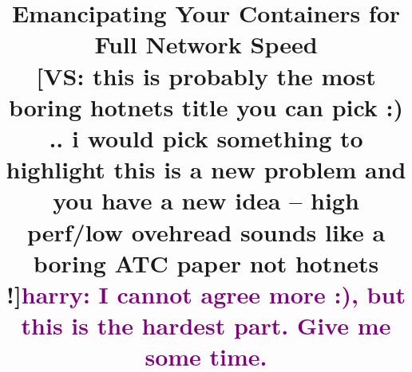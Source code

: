 \documentclass{cls/hotnets16}
\def\harry#1{{\textcolor{purple}{harry: {\sf #1}}}}
\newcommand{\vyas}[1]{{\footnotesize\color{red}[VS: #1]}}
\begin{document}
\title{Emancipating Your Containers for Full Network Speed
 \\ \vyas{this is probably the most boring hotnets title you can pick :) .. i would pick 
 something to highlight this is a new problem and you have a new idea -- high perf/low ovehread sounds like a boring ATC paper not hotnets !}\harry{I cannot agree more :), but this is the hardest part. Give me some time.}}

\date{}


\maketitle
\thispagestyle{empty}









%
%
\end{document}

